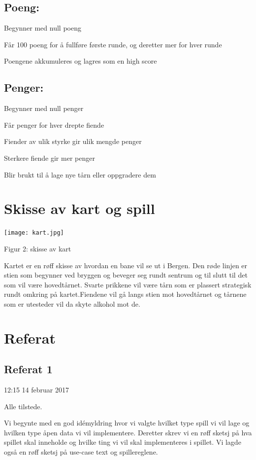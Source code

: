 \documentclass[norsk,a4paper,12 pt]{article}
\begin{document}
\subsection{Poeng:}

Begynner med null poeng

Får 100 poeng for å fullføre første runde, og deretter mer for hver runde

Poengene akkumuleres og lagres som en high score

\subsection{Penger:}

 Begynner med null penger

Får penger for hver drepte fiende

Fiender av ulik styrke gir ulik mengde penger

Sterkere fiende gir mer penger

Blir brukt til å lage nye tårn eller oppgradere dem

\section{Skisse av kart og spill}


\texttt{[image: kart.jpg]}

Figur 2: skisse av kart

Kartet er en røff skisse av hvordan en bane vil se ut i Bergen. 
Den røde linjen er stien som begynner ved bryggen og beveger seg rundt sentrum og til slutt til det som vil være hovedtårnet.
Svarte prikkene vil være tårn som er plassert strategisk rundt omkring på kartet.Fiendene vil gå langs stien mot hovedtårnet og tårnene som er utesteder vil da skyte alkohol mot de. 
\newpage

\section{Referat}

\subsection {Referat 1}

12:15 14 februar 2017

Alle tilstede.

Vi begynte med en god idémyldring hvor vi valgte hvilket type spill 
vi vil lage og hvilken type åpen data vi vil implementere. Deretter skrev vi en røff sketsj på hva spillet skal inneholde og hvilke ting vi vil skal implementeres i spillet.  Vi lagde også en røff sketsj på use-case text og spillereglene.
\end{document}
